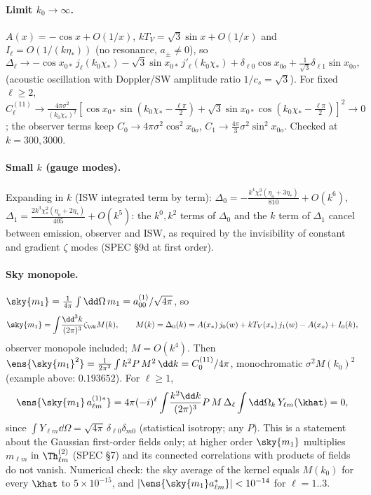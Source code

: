 \paragraph{Limit $k_0\to\infty$.}  $A(x)=-\cos x+O(1/x)$, $kT_V=\sqrt3\sin x+O(1/x)$ and $I_\ell=O(1/(k\eta_*))$ (no resonance,
$a_\pm\neq0$), so
\begin{equation}
\Delta_\ell\to-\cos x_{0*}\,j_\ell(k_0\chi_*)-\sqrt3\sin x_{0*}\,j'_\ell(k_0\chi_*)+\delta_{\ell0}\cos x_{0o}+\tfrac{1}{\sqrt3}\delta_{\ell1}\sin x_{0o},
\end{equation}
(acoustic oscillation with Doppler/SW amplitude ratio $1/c_s=\sqrt3$).  For fixed $\ell\ge2$, $C^{(11)}_\ell\to\frac{4\pi\sigma^2}{(k_0\chi_*)^2}
[\cos x_{0*}\sin(k_0\chi_*-\tfrac{\ell\pi}2)+\sqrt3\sin x_{0*}\cos(k_0\chi_*-\tfrac{\ell\pi}2)]^2\to0$; the observer terms keep
$C_0\to4\pi\sigma^2\cos^2x_{0o}$, $C_1\to\tfrac{4\pi}{3}\sigma^2\sin^2x_{0o}$.  Checked at $k=300,3000$.

\paragraph{Small $k$ (gauge modes).}  Expanding in $k$ (ISW integrated term by term):
$\Delta_0=-\frac{k^4\chi_*^3(\eta_o+3\eta_*)}{810}+O(k^6)$, $\Delta_1=\frac{2k^3\chi_*^2(\eta_o+2\eta_*)}{405}+O(k^5)$:
the $k^0,k^2$ terms of $\Delta_0$ and the $k$ term of $\Delta_1$ cancel between emission, observer and ISW, as required by the
invisibility of constant and gradient $\zeta$ modes (SPEC \S9d at first order).

\paragraph{Sky monopole.}  $\sky{m_1}=\frac1{4\pi}\int\dd\Omega\,m_1=a^{(1)}_{00}/\sqrt{4\pi}$, so
\begin{equation}
\sky{m_1}=\int\!\frac{\dd^3k}{(2\pi)^3}\zeta_\vk M(k),\qquad
M(k)=\Delta_0(k)=A(x_*)\,j_0(w)+kT_V(x_*)\,j_1(w)-A(x_o)+I_0(k),
\end{equation}
observer monopole included; $M=O(k^4)$.  Then $\ens{\sky{m_1}^2}=\frac1{2\pi^2}\int k^2P\,M^2\,\dd k=C^{(11)}_0/4\pi$, monochromatic
$\sigma^2M(k_0)^2$ (example above: $0.193652$).  For $\ell\ge1$,
\begin{equation}
\ens{\sky{m_1}\,a^{(1)*}_{\ell m}}=4\pi(-i)^\ell\int\!\frac{k^2\dd k}{(2\pi)^3}P\,M\,\Delta_\ell\int\dd\Omega_k\,Y_{\ell m}(\khat)=0,
\end{equation}
since $\int Y_{\ell m}\dd\Omega=\sqrt{4\pi}\,\delta_{\ell0}\delta_{m0}$ (statistical isotropy; any $P$).  This is a statement about the
Gaussian first-order fields only; at higher order $\sky{m_1}$ multiplies $m_{\ell m}$ in $\Th^{(2)}_{\ell m}$ (SPEC \S7) and its connected
correlations with products of fields do not vanish.  Numerical check: the sky average of the kernel equals $M(k_0)$ for every
$\khat$ to $5\times10^{-15}$, and $|\ens{\sky{m_1}a^*_{\ell m}}|<10^{-14}$ for $\ell=1..3$.

